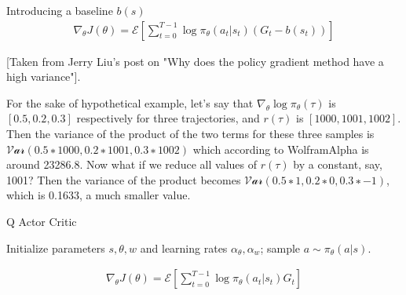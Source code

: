 \documentclass[letterpaper,11pt]{article}
\begin{document}
Introducing a baseline $b(s)$
$$
\begin{aligned}
    \nabla_{\theta} J(\theta) = \mathcal{E} [\sum\limits_{t=0}^{T-1} \log \pi_{\theta}(a_{t} | s_{t})(G_{t} - b(s_{t}))]
\end{aligned}
$$

[Taken from Jerry Liu's post on "Why does the policy gradient method have a high variance"].

For the sake of hypothetical example, let’s say that $\nabla_{\theta} \log \pi_{\theta}(\tau)$ is $[0.5, 0.2, 0.3]$ respectively for three trajectories, 
and $r(\tau)$ is $[1000, 1001, 1002]$. Then the variance of the product of the two terms for these three samples is $\mathcal{Var}(0.5∗1000,0.2∗1001,0.3∗1002)$
which according to WolframAlpha is around 23286.8. Now what if we reduce all values of $r(\tau)$ by a constant, say, 1001? Then the variance of the 
product becomes $\mathcal{Var}(0.5∗1,0.2∗0,0.3∗−1)$, which is 0.1633, a much smaller value.

\begin{algorithm}[H]
	\caption{Q Actor Critic}
	\begin{algorithmic}
        \STATE Initialize parameters $s, \theta, w$ and learning rates $\alpha_{\theta}, \alpha_{w}$; sample $a \sim \pi_\theta(a \vert s)$.
        \ENDFOR
	\end{algorithmic}
\end{algorithm}



$$
\begin{aligned}
    \nabla_{\theta} J(\theta) = \mathcal{E} [\sum\limits_{t=0}^{T-1} \log \pi_{\theta}(a_{t} | s_{t})G_{t}]
\end{aligned}
$$
\end{document}
